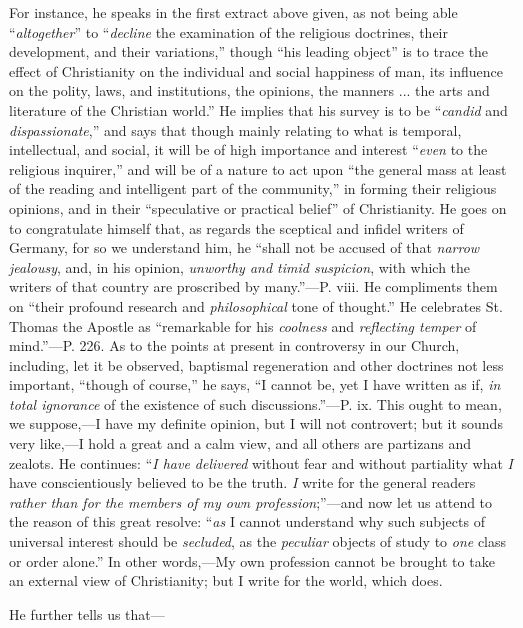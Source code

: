 For instance, he speaks in the first extract
above given, as not being able ``\emph{altogether}'' to ``\emph{decline}
the examination of the religious doctrines, their development, and
their variations,'' though ``his leading object'' is to trace the effect
of Christianity on the individual and social happiness of man, its
influence on the polity, laws, and institutions, the opinions,
the manners ... the arts and literature of the Christian world.'' He
implies that his survey is to be ``\emph{candid} and \emph{dispassionate},''
and says that though mainly relating to what is temporal,
intellectual, and social, it will be of high importance and interest ``\emph{even}
to the religious inquirer,'' and will be of a nature to act upon ``the
general mass at least of the reading and intelligent part of the
community,'' in forming their religious opinions, and in their ``speculative
or practical belief'' of Christianity. He goes on to congratulate
himself that, as regards the sceptical and infidel writers of Germany,
for so we understand him, he ``shall not be accused of that \emph{narrow
jealousy}, and, in his opinion, \emph{unworthy and timid suspicion},
with which the writers of that country are proscribed by many.''—P.
viii. He compliments them on ``their profound research and \emph{philosophical}
tone of thought.'' He celebrates St. Thomas the Apostle as ``remarkable
for his \emph{coolness} and \emph{reflecting temper} of mind.''—P.
226. As to the points at present in controversy in our Church,
including, let it be observed, baptismal regeneration and other
doctrines not less important, ``though of course,'' he says, ``I cannot
be, yet I have written as if, \emph{in total ignorance} of the
existence of such discussions.''—P. ix. This ought to mean, we
suppose,—I have my definite opinion, but I will not controvert; but
it sounds very like,—I hold a great and a calm view, and all others
are partizans and zealots. He continues: ``\emph{I have delivered}
without fear and without partiality what \emph{I} have conscientiously
believed to be the truth. \emph{I} write for the general readers \emph{rather
than for the members of my own profession};''—and now let us
attend to the reason of this great resolve: ``\emph{as} I cannot
understand why such subjects of universal interest should be \emph{secluded},
as the \emph{peculiar} objects of study to \emph{one} class or order
alone.'' In other words,—My own profession cannot be brought to take
an external view of Christianity; but I write for the world, which
does.

He further tells us that—

